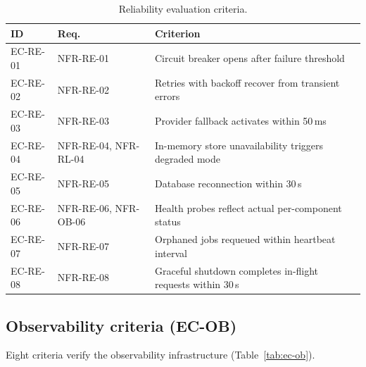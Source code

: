 \documentclass[a4paper]{sapthesis}
\begin{document}
\begin{table}[ht]
\centering
\caption{Reliability evaluation criteria.}
\label{tab:ec-re}
\small
\begin{tabularx}{\textwidth}{@{}l l X@{}}
    \hline
    \textbf{ID} & \textbf{Req.} & \textbf{Criterion} \\
    \hline
    EC-RE-01 & NFR-RE-01 & Circuit breaker opens after failure
        threshold \\
    EC-RE-02 & NFR-RE-02 & Retries with backoff recover from transient
        errors \\
    EC-RE-03 & NFR-RE-03 & Provider fallback activates within
        50\,ms \\
    EC-RE-04 & NFR-RE-04, NFR-RL-04 & In-memory store unavailability
        triggers degraded mode \\
    EC-RE-05 & NFR-RE-05 & Database reconnection within 30\,s \\
    EC-RE-06 & NFR-RE-06, NFR-OB-06 & Health probes reflect actual
        per-component status \\
    EC-RE-07 & NFR-RE-07 & Orphaned jobs requeued within heartbeat
        interval \\
    EC-RE-08 & NFR-RE-08 & Graceful shutdown completes in-flight
        requests within 30\,s \\
    \hline
\end{tabularx}
\end{table}

\subsection{Observability criteria (EC-OB)}

Eight criteria verify the observability infrastructure
(Table~\ref{tab:ec-ob}).
\end{document}
